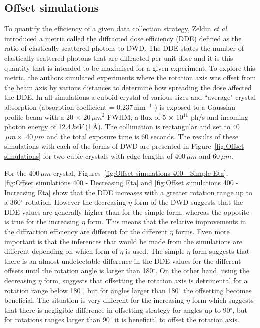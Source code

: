 \subsection{Offset simulations}
\label{sub:Offset Simulations}
To quantify the efficiency of a given data collection strategy, Zeldin \textit{et al.} introduced a metric called the diffracted dose efficiency (DDE) defined as the ratio of elastically scattered photons to DWD.
The DDE states the number of elastically scattered photons that are diffracted per unit dose and it is this quantity that is intended to be maximised for a given experiment.
To explore this metric, the authors simulated experiments where the rotation axis was offset from the beam axis by various distances to determine how spreading the dose affected the DDE.
In all simulations a cuboid crystal of various sizes and ``average" crystal absorption (absorption coefficient = 0.237$\,$mm$^{-1}$ \cite{zeldin2013}) is exposed to a Gaussian profile beam with a 20 $\times$ 20$\,\mu m^2$ FWHM, a flux of 5 $\times$ 10$^{11}$ ph/s and incoming photon energy of 12.4$\,keV$ (1$\,$\AA).
The collimation is rectangular and set to 40$\,\mu m \times$ 40$\,\mu m$ and the total exposure time is 60 seconds.
The results of these simulations with each of the forms of DWD are presented in Figure~\ref{fig:Offset simulations} for two cubic crystals with edge lengths of 400$\,\mu m$ and 60$\,\mu m$.

For the 400$\,\mu m$ crystal, Figures~\ref{fig:Offset simulations 400 - Simple Eta}, \ref{fig:Offset simulations 400 - Decreasing Eta} and \ref{fig:Offset simulations 400 - Increasing Eta} show that the DDE increases with a greater rotation range up to a 360$^{\circ}$ rotation.
However the decreasing $\eta$ form of the DWD suggests that the DDE values are generally higher than for the simple form, whereas the opposite is true for the increasing $\eta$ form.
This means that the relative improvements in the diffraction efficiency are different for the different $\eta$ forms.
Even more important is that the inferences that would be made from the simulations are different depending on which form of $\eta$ is used.
The simple $\eta$ form suggests that there is an almost undetectable difference in the DDE values for the different offsets until the rotation angle is larger than 180$^{\circ}$.
On the other hand, using the decreasing $\eta$ form, suggests that offsetting the rotation axis is detrimental for a rotation range below 180$^{\circ}$, but for angles larger than 180$^{\circ}$ the offsetting becomes beneficial.
The situation is very different for the increasing $\eta$ form which suggests that there is negligible difference in offsetting strategy for angles up to 90$^{\circ}$, but for rotations ranges larger than 90$^{\circ}$ it is beneficial to offset the rotation axis.

